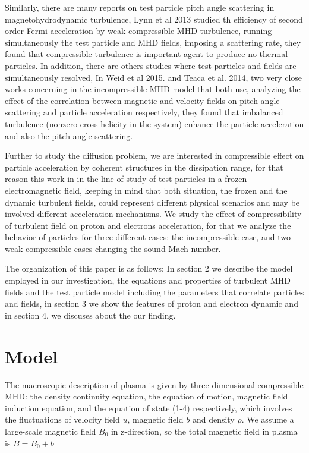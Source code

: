 \documentclass[11pt,twocolumn]{article}
\begin{document}
Similarly, there are many reports on test particle pitch angle scattering in magnetohydrodynamic turbulence, Lynn et al 2013 studied th efficiency of second order Fermi acceleration by weak compressible MHD turbulence, running simultaneously the test particle and MHD fields, imposing a scattering rate, they found that compressible turbulence is important agent to produce no-thermal particles.  In addition, there are others studies where test particles and fields are simultaneously resolved, In Weid et al 2015. and Teaca et al. 2014, two very close works concerning in the incompressible MHD model that both use, analyzing the effect of the correlation between magnetic and velocity fields on pitch-angle scattering and particle acceleration respectively, they found that imbalanced turbulence (nonzero cross-helicity in the system) enhance the particle acceleration and also the pitch angle scattering.

Further to study the diffusion problem, we are interested in compressible effect on particle acceleration by coherent structures in the dissipation range, for that reason this work in in the line of study of test particles in a frozen electromagnetic field, keeping in mind that both situation, the frozen and  the dynamic turbulent fields, could represent different physical scenarios and may be involved different acceleration mechanisms. We study the effect of compressibility of turbulent field  on proton and electrons acceleration, for that we analyze the behavior of particles for three different cases: the incompressible case, and two weak compressible cases changing the sound Mach number. 

The organization of this paper is as follows:  In section 2  we describe the model employed in our investigation, the equations and properties of turbulent MHD fields and the test particle model including the parameters that correlate particles and fields, in section 3 we show the features of proton and electron dynamic and in section 4, we discuses about the our finding.

\section*{Model}

The macroscopic description of plasma is given by three-dimensional compressible MHD: the density continuity equation, the equation of motion, magnetic field induction equation, and the equation of state (1-4) respectively, which involves the fluctuations  of velocity field $u$, magnetic field $b$ and density $\rho$. We assume a large-scale magnetic field $B_0$ in z-direction, so the total magnetic field in plasma is $B = B_0 + b$
\end{document}
